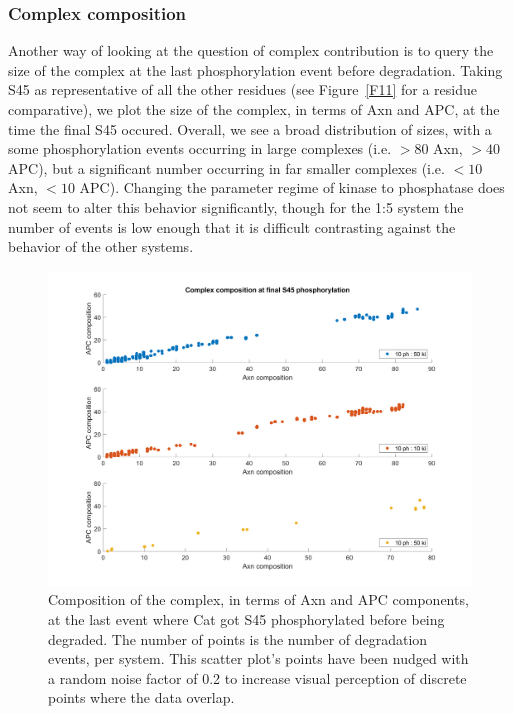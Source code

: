 \subsubsection*{Complex composition}

Another way of looking at the question of complex contribution
is to query the size of the complex at the last phosphorylation event
before degradation. Taking S45 as representative of all the other
residues (see Figure~\ref{F11} for a residue comparative), we plot the
size of the complex, in terms of Axn and APC, at the time the final S45 occured.
Overall, we see a broad distribution of sizes, with a some phosphorylation
events occurring in large complexes (i.e. $>80$ Axn, $>40$ APC), but
a significant number occurring in far smaller complexes (i.e. $<10$
Axn, $<10$ APC). Changing the parameter regime of kinase to phosphatase
does not seem to alter this behavior significantly, though for the 1:5
system the number of events is low enough that it is difficult
contrasting against the behavior of the other systems.

\begin{figure}[h]
  \centering
  \includegraphics[width=\columnwidth]{wnt/F6_complex_composition_final_S45.png}
  \caption{Composition of the complex, in terms of Axn and APC
    components, at the last event where Cat got S45 phosphorylated
    before being degraded. The number of points is the number of
    degradation events, per system. This scatter plot’s points have
    been nudged with a random noise factor of 0.2 to increase visual
    perception of discrete points where the data overlap.}
  \label{F6}
\end{figure}


